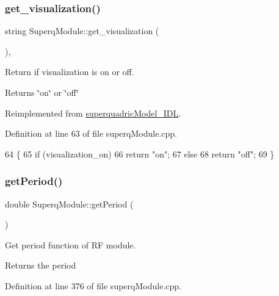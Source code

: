 \subsubsection{\texorpdfstring{get\+\_\+visualization()}{get\_visualization()}}
{\footnotesize\ttfamily string Superq\+Module\+::get\+\_\+visualization (\begin{DoxyParamCaption}{ }\end{DoxyParamCaption})\hspace{0.3cm}{\ttfamily [protected]}, {\ttfamily [virtual]}}



Return if visualization is on or off. 

\begin{DoxyReturn}{Returns}
\char`\"{}on\char`\"{} or \char`\"{}off\char`\"{} 
\end{DoxyReturn}


Reimplemented from \mbox{\hyperlink{classsuperquadricModel__IDL_a5d9f4f0622ba19b60218636dc108ef61}{superquadric\+Model\+\_\+\+I\+DL}}.



Definition at line 63 of file superq\+Module.\+cpp.


\begin{DoxyCode}
64 \{
65     \textcolor{keywordflow}{if} (visualization_on)
66         \textcolor{keywordflow}{return} \textcolor{stringliteral}{"on"};
67     \textcolor{keywordflow}{else}
68         \textcolor{keywordflow}{return} \textcolor{stringliteral}{"off"};
69 \}
\end{DoxyCode}
\mbox{\label{classSuperqModule_aeec20285d89c1542d1b91c05c0f82539}} 
\subsubsection{\texorpdfstring{get\+Period()}{getPeriod()}}
{\footnotesize\ttfamily double Superq\+Module\+::get\+Period (\begin{DoxyParamCaption}{ }\end{DoxyParamCaption})}



Get period function of RF module. 

\begin{DoxyReturn}{Returns}
the period 
\end{DoxyReturn}


Definition at line 376 of file superq\+Module.\+cpp.


